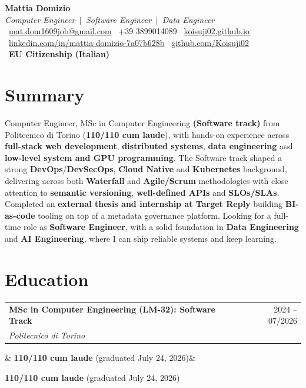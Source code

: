 \documentclass[10pt,a4paper]{article}
\makeatletter
\newcommand{\entry}[4]{%
  \noindent\begin{tabularx}{\linewidth}{@{}X r@{}}
    \textbf{#1} & #3 \\
    \textit{#2} & \\
  \end{tabularx}\vspace{-4pt}
  \ifx&#4&\else\par#4\fi
}
\makeatother
\begin{document}
\begin{center}
  {\Huge\bfseries Mattia Domizio}\\[2pt]
  {\itshape Computer Engineer \,$|$\, Software Engineer \,$|$\, Data Engineer}\\[6pt]
  \small
  \faEnvelope[regular]\, \href{mailto:mat.dom1609job@gmail.com}{mat.dom1609job@gmail.com}\quad
  \faPhone\, +39 3899014089\quad
  \faLink\, \href{https://koisuji02.github.io/}{koisuji02.github.io}\\[2pt]
  \faLinkedin\, \href{https://linkedin.com/in/mattia-domizio-7a07b628b}{linkedin.com/in/mattia-domizio-7a07b628b}\quad
  \faGithub\, \href{https://github.com/Koisuji02}{github.com/Koisuji02}\\[2pt]
  \faPassport\, \textbf{EU Citizenship (Italian)}
\end{center}

\section*{Summary}
Computer Engineer, MSc in Computer Engineering \textbf{(Software track)} from Politecnico di Torino
(\textbf{110/110 cum laude}), with hands-on experience across \textbf{full-stack web development},
\textbf{distributed systems}, \textbf{data engineering} and \textbf{low-level system and GPU programming}.
The Software track shaped a strong \textbf{DevOps}/\textbf{DevSecOps}, \textbf{Cloud Native} and
\textbf{Kubernetes} background, delivering across both \textbf{Waterfall} and \textbf{Agile/Scrum} methodologies
with close attention to \textbf{semantic versioning}, \textbf{well-defined APIs} and \textbf{SLOs/SLAs}.
Completed an \textbf{external thesis and internship at Target Reply} building \textbf{BI-as-code} tooling on top
of a metadata governance platform. Looking for a full-time role as \textbf{Software Engineer}, with a solid
foundation in \textbf{Data Engineering} and \textbf{AI Engineering}, where I can ship reliable systems and keep
learning.

\section*{Education}

\entry{MSc in Computer Engineering (LM-32): Software Track}{Politecnico di Torino}{2024 -- 07/2026}{%
\textbf{110/110 cum laude} (graduated July 24, 2026)}
\end{document}
